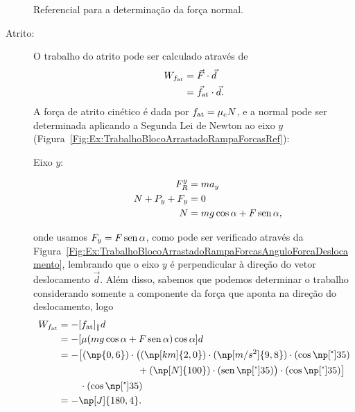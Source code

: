 \begin{description}
\begin{marginfigure}
\caption{Referencial para a determinação da força normal.\label{Fig:Ex:TrabalhoBlocoArrastadoRampaForcasRef}}
\end{marginfigure}

    \item[Atrito:] O trabalho do atrito pode ser calculado através de
    \begin{align}
        W_{f_{\rm{at}}} &= \vec{F}\cdot\vec{d} \\
        &= \vec{f}_{\rm{at}}\cdot\vec{d}.
    \end{align}
    A força de atrito cinético é dada por $f_{\rm{at}} = \mu_c N$, e a normal pode ser determinada aplicando a Segunda Lei de Newton ao eixo $y$ (Figura~\ref{Fig:Ex:TrabalhoBlocoArrastadoRampaForcasRef}):
    \begin{description}
        \item[Eixo $y$:]
            \begin{align}
                F_R^y &= m a_y \\
                N + P_y + F_y &= 0 \\
                N &= mg\cos\alpha + F\operatorname{sen}\alpha,
            \end{align}
    \end{description}
    onde usamos $F_y = F\operatorname{sen}\alpha$, como pode ser verificado através da Figura~\ref{Fig:Ex:TrabalhoBlocoArrastadoRampaForcasAnguloForcaDeslocamento}, lembrando que o eixo $y$ é perpendicular à direção do vetor deslocamento $\vec{d}$.
    Além disso, sabemos que podemos determinar o trabalho considerando somente a componente da força que aponta na direção do deslocamento, logo
    \begin{align}
        W_{f_{\rm{at}}} &= -[f_{\rm{at}}]_{\parallel} d \\
        &= - [\mu(mg\cos\alpha + F\sen\alpha)\cos\alpha]d \\
        &= -\big[(\np{0,6})\cdot\big((\np[km]{2,0})\cdot(\np[m/s^2]{9,8})\cdot(\cos\degree{35}) \nonumber\\
        &\phantom{=-\big[(\np{0,6})\cdot\big[}+ (\np[N]{100})\cdot(\sen\degree{35})\big)\cdot(\cos\degree{35})\big] \nonumber\\
        &\phantom{=-\big[}\cdot(\cos\degree{35}) \\
        &= -\np[J]{180,4}.
    \end{align}
    

\end{description}

